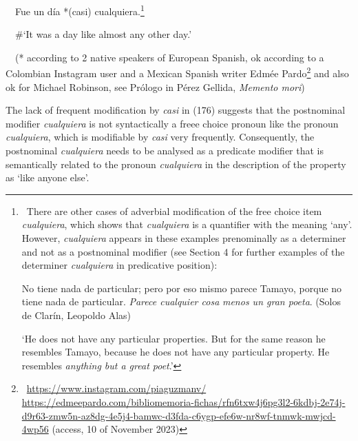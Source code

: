 \begin{styleStandard}
\ \ Fue un día *(casi) cualquiera.\footnote{\textrm{\ There are other cases of adverbial modification of the free choice item }\textrm{\textit{cualquiera}}\textrm{, which shows that }\textrm{\textit{cualquiera}}\textrm{ is a quantifier with the meaning ‘any’. However, }\textrm{\textit{cualquiera}}\textrm{ appears in these examples prenominally as a determiner and not as a postnominal modifier (see Section 4 for further examples of the determiner }\textrm{\textit{cualquiera}}\textrm{ in predicative position):}\par 
\setcounter{listWWNumxiileveli}{0}
\begin{listWWNumxiileveli}
\item 
\begin{styleFootnote}
\textrm{No tiene nada de particular; pero por eso mismo parece Tamayo, porque no tiene nada de particular. }\textrm{\textit{Parece cualquier cosa}}\textrm{ }\textrm{\textit{menos un gran poeta}}\textrm{. (Solos de Clarín, Leopoldo Alas)}
\end{styleFootnote}
\end{listWWNumxiileveli}
\textrm{‘He does not have any particular properties. But for the same reason he resembles Tamayo, because he does not have any particular property. He resembles }\textrm{\textit{anything but a great poet}}\textrm{.’}} \ \ 
\end{styleStandard}

\begin{styleStandard}
\ \ \#‘It was a day like almost any other day.’
\end{styleStandard}

\begin{styleStandard}
\ \ (* according to 2 native speakers of European Spanish, ok according to a Colombian Instagram user and a Mexican Spanish writer Edmée Pardo\footnote{\ \url{https://www.instagram.com/piaguzmanv/} \url{https://edmeepardo.com/bibliomemoria-fichas/rfn6txw4j6pg3l2-6kdbj-2e74j-d9r63-zmw5n-az8dg-4e5j4-bamwc-d3fda-c6ygp-efe6w-nr8wf-tnmwk-mwjcd-4wp56}\textrm{ (access, 10 of November 2023)}} and also ok for Michael Robinson, see Prólogo in Pérez Gellida, \textit{Memento mori})
\end{styleStandard}

\begin{styleStandard}
The lack of frequent modification by \textit{casi} in (176) suggests that the postnominal modifier \textit{cualquiera} is not syntactically a freee choice pronoun like the pronoun \textit{cualquiera}, which is modifiable by \textit{casi} very frequently. Consequently, the postnominal \textit{cualquiera} needs to be analysed as a predicate modifier that is semantically related to the pronoun \textit{cualquiera} in the description of the property as ‘like anyone else’.
\end{styleStandard}

